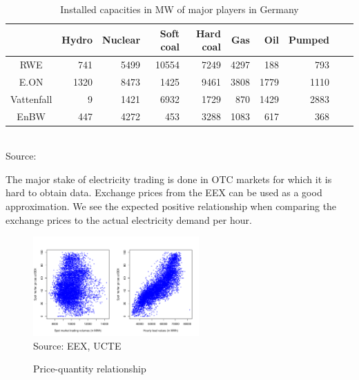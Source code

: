 \begin{table}[htb]
\centering
\scriptsize
\caption{Installed capacities in MW of major players in Germany}
\vspace{0.3cm}
\begin{tabular}[htb]{crrrrrrrrr}
\hline
           &      Hydro &    Nuclear &  Soft coal &  Hard coal &        Gas &        Oil &     Pumped \\
\hline\hline
       RWE &        741 &       5499 &      10554 &       7249 &       4297 &        188 &        793 \\

      E.ON &       1320 &       8473 &       1425 &       9461 &       3808 &       1779 &       1110 \\

Vattenfall &          9 &       1421 &       6932 &       1729 &        870 &       1429 &       2883 \\

      EnBW &        447 &       4272 &        453 &       3288 &       1083 &        617 &        368 \\
\hline
\end{tabular} 
\label{tab:majorcapacities}
\\
\vspace{0.3cm}
\scriptsize Source: \cite{Ellersdorfer2005}
\end{table}



The major stake of electricity trading is done in OTC markets for which it is hard to obtain data. Exchange prices from the EEX can be used as a good approximation. We see the expected positive relationship when comparing the exchange prices to the actual electricity demand per hour.

\begin{figure}[htb]
  \centering
\caption{Price-quantity relationship}
  \includegraphics[width=2.5in]{germandata/pricequant.pdf}
  \label{fig:investcosts}
\\
 \scriptsize Source: EEX, UCTE
\end{figure}

